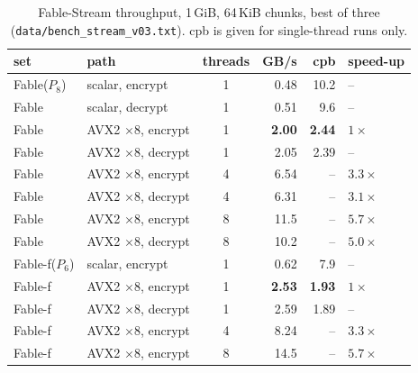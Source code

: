 \documentclass{iacrtrans}
\newcommand{\Fable}{\textsf{Fable}\xspace}
\newcommand{\FableF}{\textsf{Fable-f}\xspace}
\newcommand{\FableStream}{\textsf{Fable-Stream}\xspace}
\newcommand{\PP}[1]{P_{#1}}
\begin{document}
\begin{table}[htb]
\centering
\caption{\FableStream throughput, 1\,GiB, 64\,KiB chunks, best of three (\texttt{data/bench\_stream\_v03.txt}). cpb is given for single-thread runs only.}
\label{tab:stream}
\small
\begin{tabular}{llcrrl}
\toprule
set & path & threads & GB/s & cpb & speed-up\\
\midrule
\Fable ($\PP{8}$) & scalar, encrypt & 1 & 0.48 & 10.2 & --\\
\Fable & scalar, decrypt & 1 & 0.51 & 9.6 & --\\
\Fable & AVX2 $\times 8$, encrypt & 1 & \textbf{2.00} & \textbf{2.44} & $1\times$\\
\Fable & AVX2 $\times 8$, decrypt & 1 & 2.05 & 2.39 & --\\
\Fable & AVX2 $\times 8$, encrypt & 4 & 6.54 & -- & $3.3\times$\\
\Fable & AVX2 $\times 8$, decrypt & 4 & 6.31 & -- & $3.1\times$\\
\Fable & AVX2 $\times 8$, encrypt & 8 & 11.5 & -- & $5.7\times$\\
\Fable & AVX2 $\times 8$, decrypt & 8 & 10.2 & -- & $5.0\times$\\
\FableF ($\PP{6}$) & scalar, encrypt & 1 & 0.62 & 7.9 & --\\
\FableF & AVX2 $\times 8$, encrypt & 1 & \textbf{2.53} & \textbf{1.93} & $1\times$\\
\FableF & AVX2 $\times 8$, decrypt & 1 & 2.59 & 1.89 & --\\
\FableF & AVX2 $\times 8$, encrypt & 4 & 8.24 & -- & $3.3\times$\\
\FableF & AVX2 $\times 8$, encrypt & 8 & 14.5 & -- & $5.7\times$\\
\bottomrule
\end{tabular}
\end{table}
\end{document}
